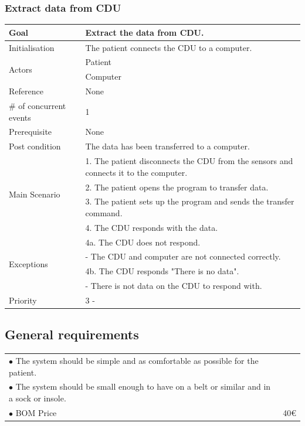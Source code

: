 \subsubsection{Extract data from CDU}
\begin{table}[H]
	\centering
	\begin{tabular}{|l|p{10cm}|}
	\hline
	Goal 							& Extract the data from CDU.\\ \hline
	Initialisation 					& The patient connects the CDU to a computer. \\ \hline
	\multirow{2}{*}{Actors} 		& Patient \\ 
									& Computer \\\hline
	Reference 						& None \\ \hline
	\# of concurrent events 		& 1 \\ \hline
	Prerequisite  					& None \\ \hline
	Post condition 					& The data has been transferred to a computer. \\ \hline
	\multirow{4}{*}{Main Scenario} 	& 1. The patient disconnects the CDU from the sensors and connects it to the computer. \\
									& 2. The patient opens the program to transfer data.\\
									& 3. The patient sets up the program and sends the transfer command.\\ 
									& 4. The CDU responds with the data. \\ \hline
	\multirow{4}{*}{Exceptions} & 4a. The CDU does not respond. \\ 
								& - The CDU and computer are not connected correctly.\\											& 4b. The CDU responds "There is no data". \\
								& - There is not data on the CDU to respond with.\\\hline
	Priority					& 3 - \\\hline
	\end{tabular}
\end{table}



\subsection{General requirements}
\begin{table}[H]
\begin{tabular}{p{10cm} p{2cm}}
$\bullet$ The system should be simple and as comfortable as possible for the patient. & \\
$\bullet$ The system should be small enough to have on a belt or similar and in a sock or insole. &\\
$\bullet$ BOM Price & 40€\\
\end{tabular}
\end{table}


